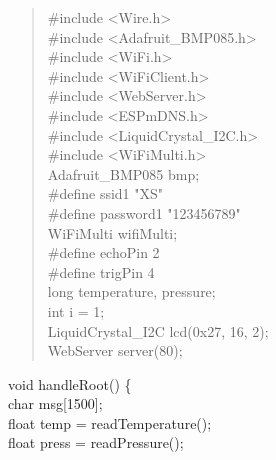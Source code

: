 \documentclass[
]{article}
\begin{document}
\begin{minipage}[b]{\linewidth}\raggedright
\begin{quote}
\#include \textless Wire.h\textgreater{}\\
\#include \textless Adafruit\_BMP085.h\textgreater{}\\
\#include \textless WiFi.h\textgreater{}\\
\#include \textless WiFiClient.h\textgreater{}\\
\#include \textless WebServer.h\textgreater{}\\
\#include \textless ESPmDNS.h\textgreater{}\\
\#include \textless LiquidCrystal\_I2C.h\textgreater{}\\
\#include \textless WiFiMulti.h\textgreater{}\\
Adafruit\_BMP085 bmp;\\
\#define ssid1 "XS"\\
\#define password1 "123456789"\\
WiFiMulti wifiMulti;\\
\#define echoPin 2\\
\#define trigPin 4\\
long temperature, pressure;\\
int i = 1;\\
LiquidCrystal\_I2C lcd(0x27, 16, 2);\\
WebServer server(80);
\end{quote}

void handleRoot() \{\\
char msg{[}1500{]};\\

float temp = readTemperature();\\
float press = readPressure();\strut
\end{minipage} \\
\end{document}
